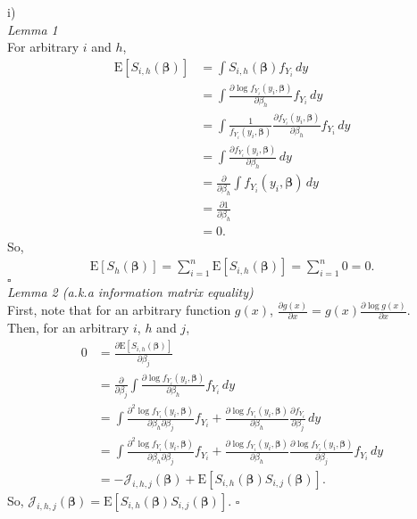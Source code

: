 \documentclass[a4paper]{article}
\newcommand{\E}{\mathrm{E}}
\begin{document}
i)\\

\textit{Lemma 1}\\
For arbitrary $i$ and $h$,
\begin{align*}
\E\left[S_{i,h}(\bm{\beta})\right] &= \int S_{i,h}(\bm{\beta}) f_{Y_{i}} \,dy\\
&= \int \frac{\partial \log f_{Y_{i}}(y_{i},\bm{\beta})}{\partial \beta_{h}} f_{Y_{i}} \,dy\\
&= \int \frac{1}{f_{Y_{i}}(y_{i},\bm{\beta})}\frac{\partial f_{Y_{i}}(y_{i},\bm{\beta})}{\partial \beta_{h}} f_{Y_{i}} \,dy\\
&= \int \frac{\partial f_{Y_{i}}(y_{i},\bm{\beta})}{\partial \beta_{h}} \,dy\\
&= \frac{\partial}{\partial \beta_{h}} \int f_{Y_{i}}(y_{i},\bm{\beta}) \,dy\\
&= \frac{\partial 1}{\partial \beta_{h}}\\
&= 0.
\end{align*}
So,
\begin{align*}
\E\left[S_{h}(\bm{\beta})\right] = \sum_{i=1}^{n}\E\left[S_{i,h}(\bm{\beta})\right] = \sum_{i=1}^{n} 0 = 0.
\end{align*}
\hfill\ensuremath{\square}\\

\textit{Lemma 2 (a.k.a information matrix equality)}\\
First, note that for an arbitrary function $g(x)$, $\frac{\partial g(x)}{\partial x} = g(x)\frac{\partial \log g(x)}{\partial x}$.\\
Then, for an arbitrary $i$, $h$ and $j$,
\begin{align*}
0 &= \frac{\partial \E\left[S_{i,h}(\bm{\beta})\right]}{\partial \beta_{j}}\\
&= \frac{\partial}{\partial \beta_{j}} \int \frac{\partial \log f_{Y_{i}}(y_{i},\bm{\beta})}{\partial \beta_{h}} f_{Y_{i}} \,dy\\
&= \int \frac{\partial^{2} \log f_{Y_{i}}(y_{i},\bm{\beta})}{\partial \beta_{h} \partial \beta_{j}}f_{Y_{i}} +\frac{\partial \log f_{Y_{i}}(y_{i},\bm{\beta})}{\partial \beta_{h}}\frac{\partial f_{Y_{i}}}{\partial \beta_{j}} \,dy\\
&= \int \frac{\partial^{2} \log f_{Y_{i}}(y_{i},\bm{\beta})}{\partial \beta_{h} \partial \beta_{j}}f_{Y_{i}} +\frac{\partial \log f_{Y_{i}}(y_{i},\bm{\beta})}{\partial \beta_{h}}\frac{\partial \log f_{Y_{i}}(y_{i},\bm{\beta})}{\partial \beta_{j}}f_{Y_{i}} \,dy\\
&= -\mathcal{J}_{i,h,j}(\bm{\beta}) + \E\left[S_{i,h}(\bm{\beta})S_{i,j}(\bm{\beta})\right].
\end{align*}
So, $\mathcal{J}_{i,h,j}(\bm{\beta}) = \E\left[S_{i,h}(\bm{\beta})S_{i,j}(\bm{\beta})\right]$.
\hfill\ensuremath{\square}\\
\end{document}
